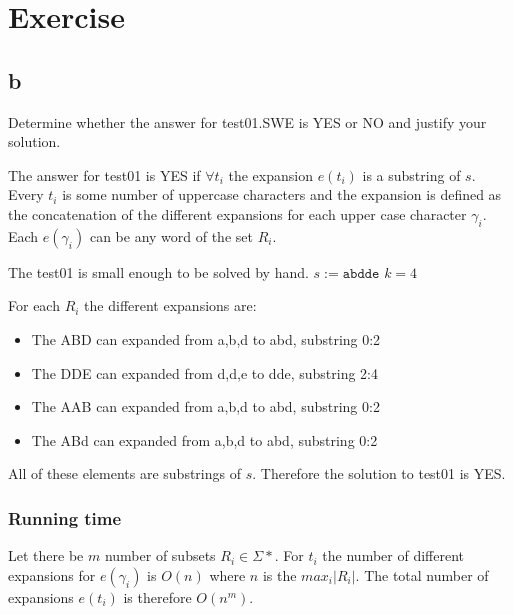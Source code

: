 \documentclass{article}
\begin{document}
\section{Exercise}
\subsection{b}


Determine whether the answer for test01.SWE is YES or NO and justify your solution. 

The answer for test01 is YES if $\forall t_i$ the expansion $e(t_i)$ is a substring of $s$. Every $t_i$ is some number of uppercase characters and the expansion is defined as the concatenation of the different expansions for each upper case character $\gamma_i$. Each $e(\gamma_i)$ can be any word of the set $R_i$. 

The test01 is small enough to be solved by hand. $s := \texttt{abdde}$ $k=4$

For each $R_i$ the different expansions are:
\begin{itemize}
    \item The ABD can expanded from a,b,d to abd, substring 0:2
    \item The DDE can expanded from d,d,e to dde, substring 2:4
    \item The AAB can expanded from a,b,d to abd, substring 0:2
    \item The ABd can expanded from a,b,d to abd, substring 0:2
\end{itemize}

All of these elements are substrings of $s$. Therefore the solution to test01 is YES.

\subsubsection{Running time}
Let there be $m$ number of subsets $R_i \in \Sigma*$. For $t_i$ the number of different expansions for $e(\gamma_i)$ is $O(n)$ where $n$ is the $max_i |R_i|$. The total number of expansions $e(t_i)$ is therefore $O(n^m)$.
\end{document}
